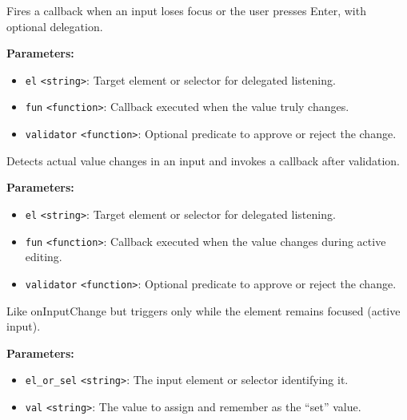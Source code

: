 \documentclass[12pt,a4paper]{article}
\begin{document}
\noindent Fires a callback when an input loses focus or the user presses Enter, with optional delegation.

\vspace{5mm}
\noindent {}


\noindent \textbf{Parameters:}
\begin{itemize}
  \item \texttt{el} \texttt{<string>}: Target element or selector for delegated listening.
  \item \texttt{fun} \texttt{<function>}: Callback executed when the value truly changes.
  \item \texttt{validator} \texttt{<function>}: Optional predicate to approve or reject the change.
\end{itemize}

\noindent Detects actual value changes in an input and invokes a callback after validation.

\vspace{5mm}
\noindent {}


\noindent \textbf{Parameters:}
\begin{itemize}
  \item \texttt{el} \texttt{<string>}: Target element or selector for delegated listening.
  \item \texttt{fun} \texttt{<function>}: Callback executed when the value changes during active editing.
  \item \texttt{validator} \texttt{<function>}: Optional predicate to approve or reject the change.
\end{itemize}

\noindent Like \textasciigrave{}onInputChange\textasciigrave{} but triggers only while the element remains focused (active input).

\vspace{5mm}
\noindent {}


\noindent \textbf{Parameters:}
\begin{itemize}
  \item \texttt{el\_or\_sel} \texttt{<string>}: The input element or selector identifying it.
  \item \texttt{val} \texttt{<string>}: The value to assign and remember as the “set” value.
\end{itemize}
\end{document}
